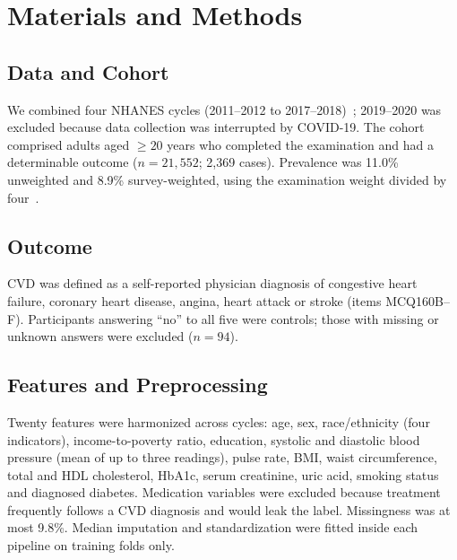 \documentclass[journal]{IEEEtran}
\begin{document}
\section{Materials and Methods}

\subsection{Data and Cohort}
We combined four NHANES cycles (2011--2012 to 2017--2018)~\cite{nhanes}; 2019--2020 was excluded because data collection was interrupted by COVID-19. The cohort comprised adults aged $\geq 20$ years who completed the examination and had a determinable outcome ($n = 21{,}552$; 2{,}369 cases). Prevalence was 11.0\% unweighted and 8.9\% survey-weighted, using the examination weight divided by four~\cite{johnson2013}.

\subsection{Outcome}
CVD was defined as a self-reported physician diagnosis of congestive heart failure, coronary heart disease, angina, heart attack or stroke (items MCQ160B--F). Participants answering ``no'' to all five were controls; those with missing or unknown answers were excluded ($n = 94$).

\subsection{Features and Preprocessing}
Twenty features were harmonized across cycles: age, sex, race/ethnicity (four indicators), income-to-poverty ratio, education, systolic and diastolic blood pressure (mean of up to three readings), pulse rate, BMI, waist circumference, total and HDL cholesterol, HbA1c, serum creatinine, uric acid, smoking status and diagnosed diabetes. Medication variables were excluded because treatment frequently follows a CVD diagnosis and would leak the label. Missingness was at most 9.8\%. Median imputation and standardization were fitted inside each pipeline on training folds only.
\end{document}

